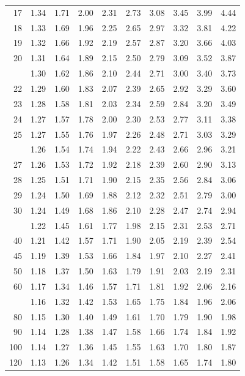 \documentclass[10pt]{article}
\begin{document}
\begin{longtable}{@{}r!{\vrule width 0.8pt\hspace{0.55em}}rrrrrrrrr@{}}
17 & 1.34 & 1.71 & 2.00 & 2.31 & 2.73 & 3.08 & 3.45 & 3.99 & 4.44 \\
18 & 1.33 & 1.69 & 1.96 & 2.25 & 2.65 & 2.97 & 3.32 & 3.81 & 4.22 \\
19 & 1.32 & 1.66 & 1.92 & 2.19 & 2.57 & 2.87 & 3.20 & 3.66 & 4.03 \\
20 & 1.31 & 1.64 & 1.89 & 2.15 & 2.50 & 2.79 & 3.09 & 3.52 & 3.87 \\
 & 1.30 & 1.62 & 1.86 & 2.10 & 2.44 & 2.71 & 3.00 & 3.40 & 3.73 \\
22 & 1.29 & 1.60 & 1.83 & 2.07 & 2.39 & 2.65 & 2.92 & 3.29 & 3.60 \\
23 & 1.28 & 1.58 & 1.81 & 2.03 & 2.34 & 2.59 & 2.84 & 3.20 & 3.49 \\
24 & 1.27 & 1.57 & 1.78 & 2.00 & 2.30 & 2.53 & 2.77 & 3.11 & 3.38 \\
25 & 1.27 & 1.55 & 1.76 & 1.97 & 2.26 & 2.48 & 2.71 & 3.03 & 3.29 \\
 & 1.26 & 1.54 & 1.74 & 1.94 & 2.22 & 2.43 & 2.66 & 2.96 & 3.21 \\
27 & 1.26 & 1.53 & 1.72 & 1.92 & 2.18 & 2.39 & 2.60 & 2.90 & 3.13 \\
28 & 1.25 & 1.51 & 1.71 & 1.90 & 2.15 & 2.35 & 2.56 & 2.84 & 3.06 \\
29 & 1.24 & 1.50 & 1.69 & 1.88 & 2.12 & 2.32 & 2.51 & 2.79 & 3.00 \\
30 & 1.24 & 1.49 & 1.68 & 1.86 & 2.10 & 2.28 & 2.47 & 2.74 & 2.94 \\
 & 1.22 & 1.45 & 1.61 & 1.77 & 1.98 & 2.15 & 2.31 & 2.53 & 2.71 \\
40 & 1.21 & 1.42 & 1.57 & 1.71 & 1.90 & 2.05 & 2.19 & 2.39 & 2.54 \\
45 & 1.19 & 1.39 & 1.53 & 1.66 & 1.84 & 1.97 & 2.10 & 2.27 & 2.41 \\
50 & 1.18 & 1.37 & 1.50 & 1.63 & 1.79 & 1.91 & 2.03 & 2.19 & 2.31 \\
60 & 1.17 & 1.34 & 1.46 & 1.57 & 1.71 & 1.81 & 1.92 & 2.06 & 2.16 \\
 & 1.16 & 1.32 & 1.42 & 1.53 & 1.65 & 1.75 & 1.84 & 1.96 & 2.06 \\
80 & 1.15 & 1.30 & 1.40 & 1.49 & 1.61 & 1.70 & 1.79 & 1.90 & 1.98 \\
90 & 1.14 & 1.28 & 1.38 & 1.47 & 1.58 & 1.66 & 1.74 & 1.84 & 1.92 \\
100 & 1.14 & 1.27 & 1.36 & 1.45 & 1.55 & 1.63 & 1.70 & 1.80 & 1.87 \\
120 & 1.13 & 1.26 & 1.34 & 1.42 & 1.51 & 1.58 & 1.65 & 1.74 & 1.80 \\

\end{longtable}
\end{document}
